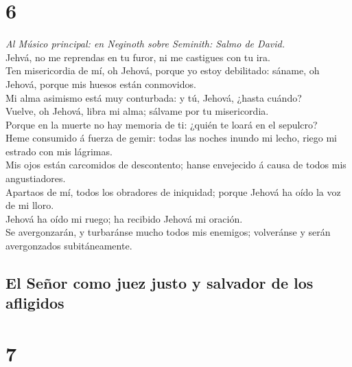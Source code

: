 \hypertarget{section-5}{%
\section{6}\label{section-5}}

 \emph{Al Músico principal: en Neginoth sobre Seminith:
Salmo de David.}\\
Jehvá, no me reprendas en tu furor, ni me castigues con tu ira.\\
 Ten misericordia de mí, oh Jehová, porque yo estoy
debilitado: sáname, oh Jehová, porque mis huesos están conmovidos.\\
 Mi alma asimismo está muy conturbada: y tú, Jehová, ¿hasta
cuándo?\\
 Vuelve, oh Jehová, libra mi alma; sálvame por tu
misericordia.\\
 Porque en la muerte no hay memoria de ti: ¿quién te loará
en el sepulcro?\\
 Heme consumido á fuerza de gemir: todas las noches inundo
mi lecho, riego mi estrado con mis lágrimas.\\
 Mis ojos están carcomidos de descontento; hanse envejecido
á causa de todos mis angustiadores.\\
 Apartaos de mí, todos los obradores de iniquidad; porque
Jehová ha oído la voz de mi lloro.\\
 Jehová ha oído mi ruego; ha recibido Jehová mi oración.\\
 Se avergonzarán, y turbaránse mucho todos mis enemigos;
volveránse y serán avergonzados subitáneamente.

\hypertarget{el-seuxf1or-como-juez-justo-y-salvador-de-los-afligidos}{%
\subsection{El Señor como juez justo y salvador de los
afligidos}\label{el-seuxf1or-como-juez-justo-y-salvador-de-los-afligidos}}

\hypertarget{section-6}{%
\section{7}\label{section-6}}

